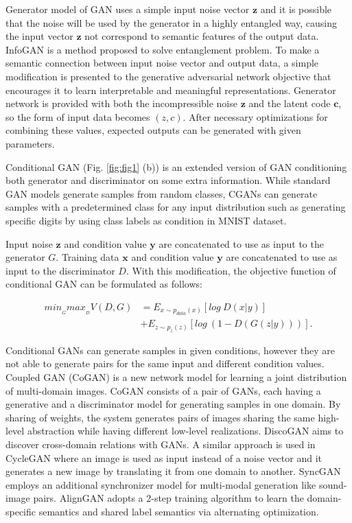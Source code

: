 \documentclass[runningheads]{llncs}
\begin{document}
Generator model of GAN uses a simple input noise vector $\mathbf{z}$ and it is possible that the noise will be used by the generator in a highly entangled way, causing the input vector $\mathbf{z}$ not correspond to semantic features of the output data.  InfoGAN \cite{chen2016infogan} is a method proposed to solve entanglement problem. To make a semantic connection between input noise vector and output data, a simple modification is presented to the generative adversarial network objective that encourages it to learn interpretable and meaningful representations. Generator network is provided with both the incompressible noise $\mathbf{z}$ and the latent code $\mathbf{c}$, so the form of input data becomes $(z, c)$. After necessary optimizations for combining these values, expected outputs can be generated with given parameters.

Conditional GAN (Fig. \ref{fig:fig1} (b)) is an extended version of GAN \cite{mirza2014conditional} conditioning both generator and discriminator on some extra information. While standard GAN models generate samples from random classes, CGANs can generate samples with a predetermined class for any input distribution such as generating specific digits by using class labels as condition in MNIST dataset.

Input noise $\mathbf{z}$ and condition value $\mathbf{y}$  are concatenated to use as input to the generator $G$. Training data $\mathbf{x}$ and condition value $\mathbf{y}$ are concatenated to use as input to the discriminator $D$. With this modification, the objective function of conditional GAN can be formulated as follows:

\begin{equation}
\begin{split}
min_{_{G}}max_{_{D}}V(D,G) &= E_{x\sim p_{data}(x)}[log~D(x|y)] \\
&+  E_{z\sim p_{z}(z)}[log~ (1-D(G(z|y)))].
\end{split}
\end{equation}

Conditional GANs can generate samples in given conditions, however they are not able to generate pairs for the same input and different condition values. Coupled GAN (CoGAN) \cite{liu2016coupled} is a new network model for learning a joint distribution of multi-domain images. CoGAN consists of a pair of GANs, each having a generative and a discriminator model for generating samples in one domain. By sharing of weights, the system generates pairs of images sharing the same high-level abstraction while having different low-level realizations. DiscoGAN \cite{kim2017learning} aims to discover cross-domain relations with GANs. A similar approach is used in CycleGAN \cite{zhu2017unpaired} where an image is used as input instead of a noise vector and it generates a new image by translating it from one domain to another. SyncGAN \cite{chen2018syncgan} employs an additional synchronizer model for multi-modal generation like sound-image pairs. AlignGAN \cite{mao2017aligngan} adopts a 2-step training algorithm to learn the domain-specific semantics and shared label semantics via alternating optimization.
\end{document}
